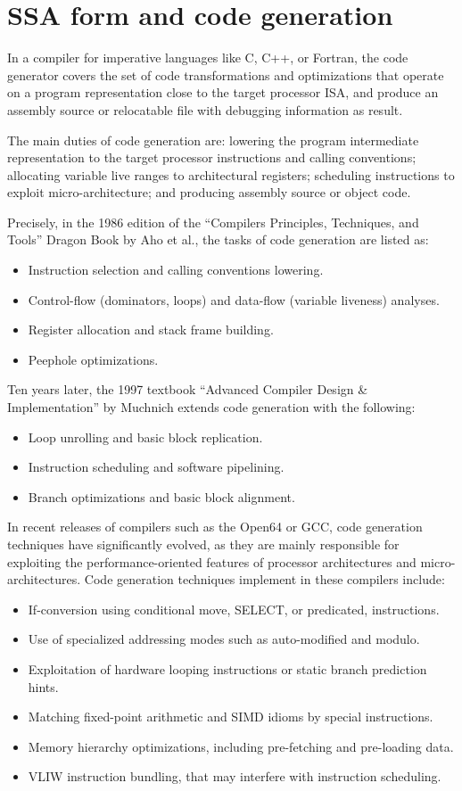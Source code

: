 \chapter{SSA form and code generation }
\label{chap:ssa-codegen}

In a compiler for imperative languages like C, C++, or Fortran, the code
generator covers the set of code transformations and optimizations that operate
on a program representation close to the target processor ISA, and produce an
assembly source or relocatable file with debugging information as result.

The main duties of code generation are: lowering the program intermediate
representation to the target processor instructions and calling conventions;
allocating variable live ranges to architectural registers; scheduling
instructions to exploit micro-architecture; and producing assembly source or
object code.

Precisely, in the 1986 edition of
the ``Compilers Principles, Techniques, and Tools'' Dragon Book by Aho et al.,
the tasks of code generation are listed as:
\begin{itemize}
\item Instruction selection and calling conventions lowering.
\item Control-flow (dominators, loops) and data-flow (variable liveness) analyses.
\item Register allocation and stack frame building.
\item Peephole optimizations.
\end{itemize}
Ten years later, the 1997 textbook ``Advanced Compiler Design \& Implementation''
by Muchnich extends code generation with the following: \begin{itemize}
\item Loop unrolling and basic block replication.
\item Instruction scheduling and software pipelining.
\item Branch optimizations and basic block alignment.
\end{itemize}
In recent releases of compilers such as the Open64 or GCC, code generation
techniques have significantly evolved, as they are mainly responsible for
exploiting the performance-oriented features of processor architectures and
micro-architectures. Code generation techniques implement in these compilers
include: \begin{itemize}
\item If-conversion using conditional move, SELECT, or predicated, instructions.
\item Use of specialized addressing modes such as auto-modified and modulo.
\item Exploitation of hardware looping instructions or static branch prediction
hints.
\item Matching fixed-point arithmetic and SIMD idioms by special instructions.
\item Memory hierarchy optimizations, including pre-fetching and pre-loading
data.
\item VLIW instruction bundling, that may interfere with instruction
scheduling.
\end{itemize}

